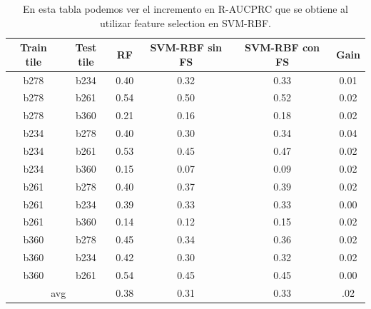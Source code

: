 \begin{table}[]
\centering
\begin{tabular}{|c|c|c|c|c|c|}
\hline
\textbf{Train tile} & \textbf{Test tile} & \textbf{RF} & \textbf{SVM-RBF sin FS} & \textbf{SVM-RBF con FS} & \textbf{Gain} \\ \hline
b278                & b234               & 0.40        & 0.32                    & 0.33                    & 0.01          \\ \hline
b278                & b261               & 0.54        & 0.50                    & 0.52                    & 0.02          \\ \hline
b278                & b360               & 0.21        & 0.16                    & 0.18                    & 0.02          \\ \hline
b234                & b278               & 0.40        & 0.30                    & 0.34                    & 0.04          \\ \hline
b234                & b261               & 0.53        & 0.45                    & 0.47                    & 0.02          \\ \hline
b234                & b360               & 0.15        & 0.07                    & 0.09                    & 0.02          \\ \hline
b261                & b278               & 0.40        & 0.37                    & 0.39                    & 0.02          \\ \hline
b261                & b234               & 0.39        & 0.33                    & 0.33                    & 0.00          \\ \hline
b261                & b360               & 0.14        & 0.12                    & 0.15                    & 0.02          \\ \hline
b360                & b278               & 0.45        & 0.34                    & 0.36                    & 0.02          \\ \hline
b360                & b234               & 0.42        & 0.30                    & 0.32                    & 0.02          \\ \hline
b360                & b261               & 0.54        & 0.45                    & 0.45                    & 0.00          \\ \hline
\multicolumn{2}{|c|}{avg}                & 0.38        & 0.31                    & 0.33                   & {\color[HTML]{009901} .02}          \\ \hline
\end{tabular}
\caption{En esta tabla podemos ver el incremento en R-AUCPRC que se obtiene al utilizar feature selection en SVM-RBF. }
\label{tab:fs_comparison_r} 
\end{table}